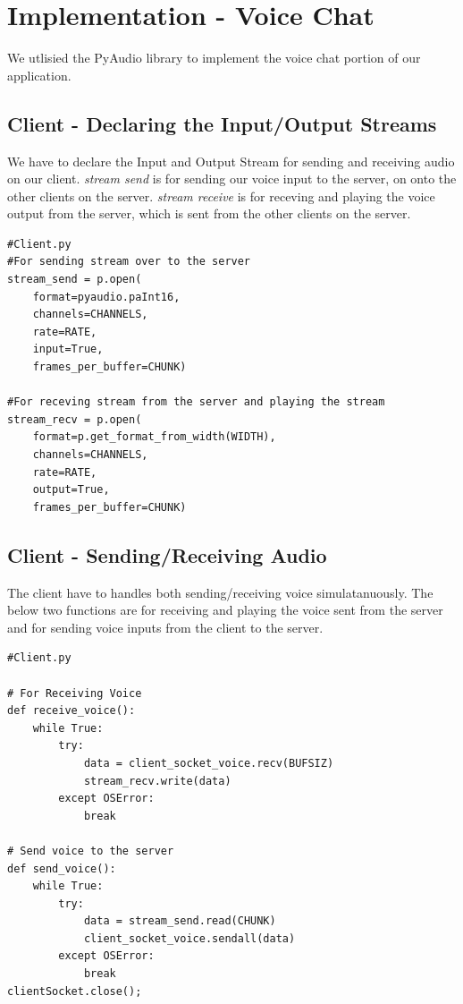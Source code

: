 \documentclass[a4paper,11pt]{article}
\begin{document}
\section{Implementation - Voice Chat}
We utlisied the PyAudio library to implement the voice chat portion of our application.

\subsection{Client - Declaring the Input/Output Streams}
We have to declare the Input and Output Stream for sending and receiving audio on our client. \textit{stream send} is for sending our voice input to the server, on onto the other clients on the server. \textit{stream receive} is for receving and playing the voice output from the server, which is sent from the other clients on the server.
\begin{mdframed}[backgroundcolor=light-gray, roundcorner=30pt,leftmargin=1, rightmargin=1, innerleftmargin=5, innertopmargin=-3,innerbottommargin=5, outerlinewidth=1, linecolor=light-gray]
\begin{lstlisting}
#Client.py
#For sending stream over to the server
stream_send = p.open(
	format=pyaudio.paInt16,
	channels=CHANNELS,
	rate=RATE,
	input=True,
	frames_per_buffer=CHUNK)

#For receving stream from the server and playing the stream
stream_recv = p.open(
	format=p.get_format_from_width(WIDTH),
	channels=CHANNELS,
	rate=RATE,
	output=True,
	frames_per_buffer=CHUNK)

\end{lstlisting}
\end{mdframed}

\subsection{Client - Sending/Receiving  Audio}
The client have to handles both sending/receiving voice simulatanuously. The below two functions are for receiving and playing the voice sent from the server and for sending voice inputs from the client to the server.
\begin{mdframed}[backgroundcolor=light-gray, roundcorner=30pt,leftmargin=1, rightmargin=1, innerleftmargin=5, innertopmargin=-3,innerbottommargin=5, outerlinewidth=1, linecolor=light-gray]
\begin{lstlisting}
#Client.py

# For Receiving Voice
def receive_voice():
	while True:
		try:
			data = client_socket_voice.recv(BUFSIZ)
			stream_recv.write(data)
		except OSError:
			break

# Send voice to the server
def send_voice():
	while True:
		try:
			data = stream_send.read(CHUNK)
			client_socket_voice.sendall(data)
		except OSError:
			break
clientSocket.close();
\end{lstlisting}
\end{mdframed}
\end{document}
